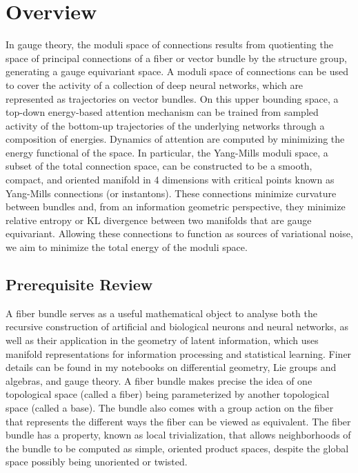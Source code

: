 \documentclass{article}
\begin{document}
\section{Overview}
In gauge theory, the moduli space of connections results from quotienting the space of principal connections of a fiber or vector bundle by the structure group, generating a gauge equivariant space. A moduli space of connections can be used to cover the activity of a collection of deep neural networks, which are represented as trajectories on vector bundles. On this upper bounding space, a top-down energy-based attention mechanism can be trained from sampled activity of the bottom-up trajectories of the underlying networks through a composition of energies. Dynamics of attention are computed by minimizing the energy functional of the space. In particular, the Yang-Mills moduli space, a subset of the total connection space, can be constructed to be a smooth, compact, and oriented manifold in 4 dimensions with critical points known as Yang-Mills connections (or instantons). These connections minimize curvature between bundles and, from an information geometric perspective, they minimize relative entropy or KL divergence between two manifolds that are gauge equivariant. Allowing these connections to function as sources of variational noise, we aim to minimize the total energy of the moduli space. 



\subsection{Prerequisite Review}
    A fiber bundle serves as a useful mathematical object to analyse both the recursive construction of artificial and biological neurons and neural networks, as well as their application in the geometry of latent information, which uses manifold representations for information processing and statistical learning.
    Finer details can be found in my notebooks on differential geometry, Lie groups and algebras, and gauge theory. A fiber bundle makes precise the idea of one topological space (called a fiber) being parameterized by another topological space (called a base). The bundle also comes with a group action on the fiber that represents the different ways the fiber can be viewed as equivalent. The fiber bundle has a property, known as local trivialization, that allows neighborhoods of the bundle to be computed as simple, oriented product spaces, despite the global space possibly being unoriented or twisted.
    
\end{document}
